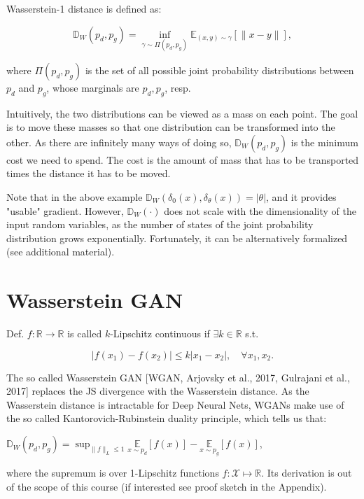 \documentclass[10pt]{article}
\begin{document}
Wasserstein-1 distance is defined as:

$$
\mathbb{D}_{W}\left(p_{d}, p_{g}\right)=\inf _{\gamma \sim \Pi\left(p_{d}, p_{g}\right)} \mathbb{E}_{(x, y) \sim \gamma}[\|x-y\|],
$$

where $\Pi\left(p_{d}, p_{g}\right)$ is the set of all possible joint probability distributions between $p_{d}$ and $p_{g}$, whose marginals are $p_{d}, p_{g}$, resp.

Intuitively, the two distributions can be viewed as a mass on each point. The goal is to move these masses so that one distribution can be transformed into the other. As there are infinitely many ways of doing so, $\mathbb{D}_{W}\left(p_{d}, p_{g}\right)$ is the minimum cost we need to spend. The cost is the amount of mass that has to be transported times the distance it has to be moved.

Note that in the above example $\mathbb{D}_{W}\left(\delta_{0}(x), \delta_{\theta}(x)\right)=|\theta|$, and it provides "usable" gradient. However, $\mathbb{D}_{W}(\cdot)$ does not scale with the dimensionality of the input random variables, as the number of states of the joint probability distribution grows exponentially. Fortunately, it can be alternatively formalized (see additional material).

\section*{Wasserstein GAN}
Def. $f: \mathbb{R} \rightarrow \mathbb{R}$ is called $k$-Lipschitz continuous if $\exists k \in \mathbb{R}$ s.t.

$$
\left|f\left(x_{1}\right)-f\left(x_{2}\right)\right| \leq k\left|x_{1}-x_{2}\right|, \quad \forall x_{1}, x_{2} .
$$

The so called Wasserstein GAN [WGAN, Arjovsky et al., 2017, Gulrajani et al., 2017] replaces the JS divergence with the Wasserstein distance. As the Wasserstein distance is intractable for Deep Neural Nets, WGANs make use of the so called Kantorovich-Rubinstein duality principle, which tells us that:

$\mathbb{D}_{W}\left(p_{d}, p_{g}\right)=\sup _{\|f\|_{L} \leq 1} \underset{x \sim p_{d}}{\mathbb{E}}[f(x)]-\underset{x \sim p_{g}}{\mathbb{E}}[f(x)]$,

where the supremum is over 1-Lipschitz functions $f: \mathcal{X} \mapsto \mathbb{R}$. Its derivation is out of the scope of this course (if interested see proof sketch in the Appendix).
\end{document}
